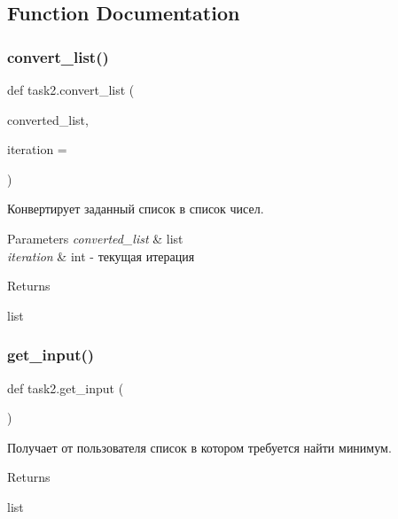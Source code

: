 \subsection{Function Documentation}
\mbox{\label{namespacetask2_a1cc67c3848267075b4e68b63b9f85a86}} 
\subsubsection{\texorpdfstring{convert\+\_\+list()}{convert\_list()}}
{\footnotesize\ttfamily def task2.\+convert\+\_\+list (\begin{DoxyParamCaption}\item[{}]{converted\+\_\+list,  }\item[{}]{iteration = {} }\end{DoxyParamCaption})}



Конвертирует заданный список в список чисел. 


\begin{DoxyParams}{Parameters}
{\em converted\+\_\+list} & list \\
\hline
{\em iteration} & int -\/ текущая итерация\\
\hline
\end{DoxyParams}
\begin{DoxyReturn}{Returns}


list 
\end{DoxyReturn}
\mbox{\label{namespacetask2_a748c12c01cd27c3dc6a6a90e35bbce97}} 
\subsubsection{\texorpdfstring{get\+\_\+input()}{get\_input()}}
{\footnotesize\ttfamily def task2.\+get\+\_\+input (\begin{DoxyParamCaption}{ }\end{DoxyParamCaption})}



Получает от пользователя список в котором требуется найти минимум. 

\begin{DoxyReturn}{Returns}


list 
\end{DoxyReturn}
\mbox{\label{namespacetask2_a01898c85ce38c2776909e1b5b13261e7}} 
